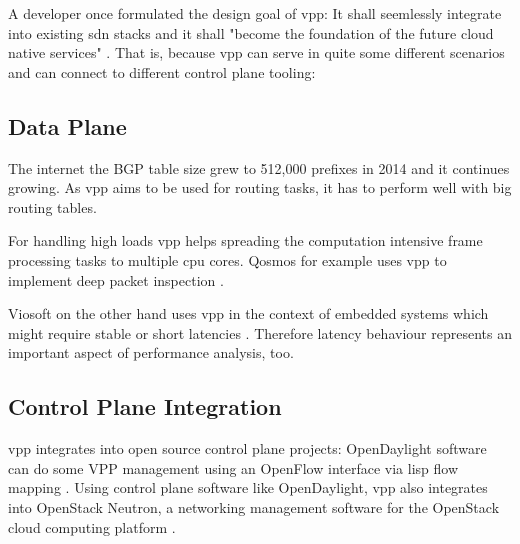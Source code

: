 
A developer once formulated the design goal of \Ac{vpp}: It shall
seemlessly integrate into existing \Ac{sdn} stacks and it shall
"become the foundation of the future cloud native services"
\cite{florincoras}. That is, because \Ac{vpp} can serve in quite some
different scenarios and can connect to different control plane
tooling:

\subsection{Data Plane}


The internet the BGP table size grew to 512,000 prefixes in 2014 and
it continues growing. As \Ac{vpp} aims to be used for routing tasks,
it has to perform well with big routing tables. \cite{bgphelp:size}


For handling high loads \Ac{vpp} helps spreading the computation
intensive frame processing tasks to multiple cpu cores. Qosmos for
example uses \Ac{vpp} to implement deep packet inspection
\cite{qosmos}.


Viosoft on the other hand uses \Ac{vpp} in the context of embedded
systems which might require stable or short latencies \cite{viosoft}.
Therefore latency behaviour represents an important aspect of
performance analysis, too.


\subsection{Control Plane Integration}

\Ac{vpp} integrates into open source control plane projects:
OpenDaylight software can do some VPP management using an OpenFlow
interface via \Ac{lisp} flow mapping \cite{opendaylight:lisp}. Using
control plane software like OpenDaylight, \Ac{vpp} also integrates
into OpenStack Neutron, a networking management software for the
OpenStack cloud computing platform \cite{fdio:integration}.



